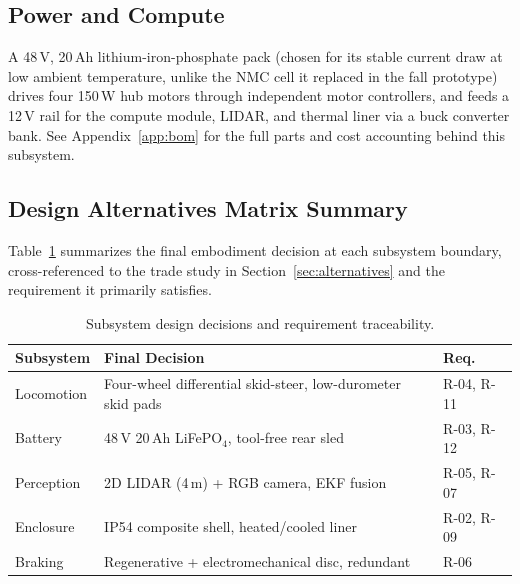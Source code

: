 \subsection{Power and Compute}
A 48\,V, 20\,Ah lithium-iron-phosphate pack (chosen for its stable current
draw at low ambient temperature, unlike the NMC cell it replaced in the fall
prototype) drives four 150\,W hub motors through independent motor
controllers, and feeds a 12\,V rail for the compute module, LIDAR, and
thermal liner via a buck converter bank. See Appendix~\ref{app:bom} for the
full parts and cost accounting behind this subsystem.

\subsection{Design Alternatives Matrix Summary}
Table~\ref{tab:decisions} summarizes the final embodiment decision at each
subsystem boundary, cross-referenced to the trade study in
Section~\ref{sec:alternatives} and the requirement it primarily satisfies.

\begin{table}[htbp]
\centering
\caption{Subsystem design decisions and requirement traceability.}
\label{tab:decisions}
\small
\begin{tabularx}{\textwidth}{@{}lXl@{}}
\toprule
\textbf{Subsystem} & \textbf{Final Decision} & \textbf{Req.} \\
\midrule
Locomotion   & Four-wheel differential skid-steer, low-durometer skid pads & R-04, R-11 \\
Battery      & 48\,V 20\,Ah LiFePO$_4$, tool-free rear sled & R-03, R-12 \\
Perception   & 2D LIDAR (4\,m) + RGB camera, EKF fusion & R-05, R-07 \\
Enclosure    & IP54 composite shell, heated/cooled liner & R-02, R-09 \\
Braking      & Regenerative + electromechanical disc, redundant & R-06 \\
\bottomrule
\end{tabularx}
\end{table}
